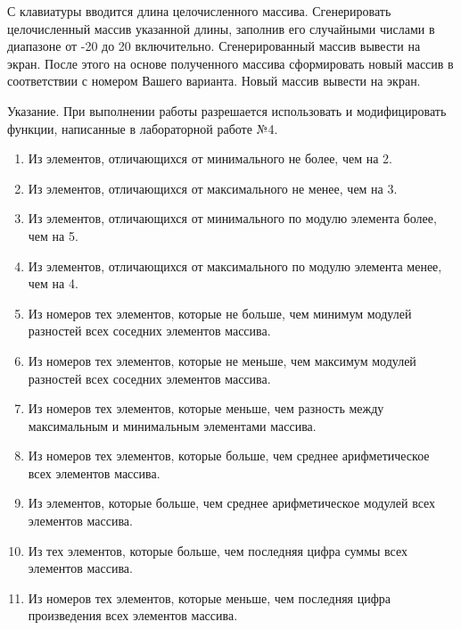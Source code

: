
\labtask

С клавиатуры вводится длина целочисленного массива.
Сгенерировать целочисленный массив указанной длины, заполнив его случайными числами в диапазоне от -20 до 20 включительно.
Сгенерированный массив вывести на экран.
После этого на основе полученного массива сформировать новый массив в соответствии с номером Вашего варианта.
Новый массив вывести на экран.

Указание. При выполнении работы разрешается использовать и модифицировать функции, написанные в лабораторной работе №4.

\begin{enumerate}

	\item
		Из элементов, отличающихся от минимального не более, чем на 2.

	\item
		Из элементов, отличающихся от максимального не менее, чем на 3.

	\item
		Из элементов, отличающихся от минимального по модулю элемента более, чем на 5.

	\item
		Из элементов, отличающихся от максимального по модулю элемента менее, чем на 4.

	\item
		Из номеров тех элементов, которые не больше, чем  минимум модулей разностей всех соседних элементов массива.

	\item
		Из номеров тех элементов, которые не меньше, чем максимум модулей разностей всех соседних элементов массива.

	\item
		Из номеров тех элементов, которые меньше, чем разность между максимальным и минимальным элементами массива.

	\item
		Из номеров тех элементов, которые больше, чем среднее арифметическое всех элементов массива.

	\item
		Из элементов, которые больше, чем среднее арифметическое модулей всех элементов массива.

	\item
		Из тех элементов, которые больше, чем последняя цифра суммы всех элементов массива.

	\item
		Из номеров тех элементов, которые меньше, чем последняя цифра произведения всех элементов массива.


\end{enumerate}
